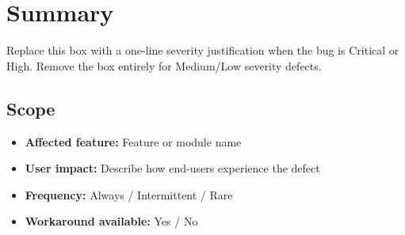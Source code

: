 \section{Summary}


\begin{warningbox}
Replace this box with a one-line severity justification when the bug is
Critical or High. Remove the box entirely for Medium/Low severity defects.
\end{warningbox}


\subsection{Scope}


\begin{itemize}
    \item \textbf{Affected feature:} Feature or module name
    \item \textbf{User impact:} Describe how end-users experience the defect
    \item \textbf{Frequency:} Always / Intermittent / Rare
    \item \textbf{Workaround available:} Yes / No
\end{itemize}

%
